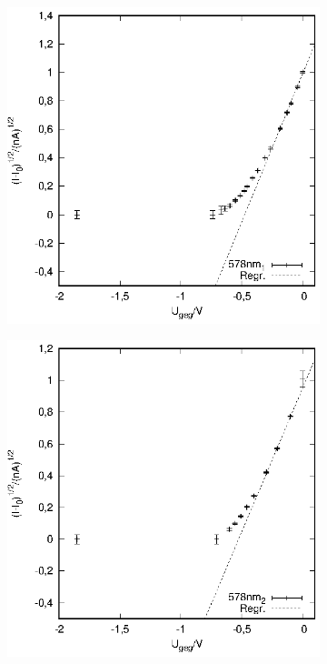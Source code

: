 \begin{figure}[hbt]
\begin{subfigure}[h]{0.5\textwidth}
  \end{subfigure}
  \begin{subfigure}[h]{0.5\textwidth}
    \centering
    \includegraphics{data/Messung_photoeffekt/578nm_1.eps}
  \end{subfigure}%
  \begin{subfigure}[h]{0.5\textwidth}
    \centering
    \includegraphics{data/Messung_photoeffekt/578nm_2.eps}
  \end{subfigure}%
\end{figure}

